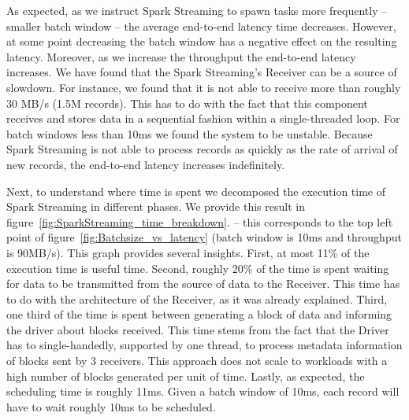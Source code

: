 As expected, as we instruct Spark Streaming to spawn tasks more frequently -- smaller batch window -- the average end-to-end latency time decreases.
However, at some point decreasing the batch window has a negative effect on the resulting latency.
Moreover, as we increase the throughput the end-to-end latency increases.
We have found that the Spark Streaming's Receiver can be a source of slowdown.
For instance, we found that it is not able to receive more than roughly 30 MB/s (1.5M records).
This has to do with the fact that this component receives and stores data in a sequential fashion within a single-threaded loop.
For batch windows less than 10ms we found the system to be unstable. 
Because Spark Streaming is not able to process records as quickly as the rate of arrival of new records, the end-to-end latency increases indefinitely.

Next, to understand where time is spent we decomposed the execution time of Spark Streaming in different phases.
We provide this result in figure~\ref{fig:SparkStreaming_time_breakdown}. 
-- this corresponds to the top left point of figure~\ref{fig:Batchsize_vs_latency} (batch window is 10ms and throughput is 90MB/s).
This graph provides several insights. 
First, at most 11\% of the execution time is useful time.
Second, roughly 20\% of the time is spent waiting for data to be transmitted from the source of data to the Receiver.
This time has to do with the architecture of the Receiver, as it was already explained.
Third, one third of the time is spent between generating a block of data and informing the driver about blocks received.
This time stems from the fact that the Driver has to single-handedly, supported by one thread, to process metadata information of blocks sent by 3 receivers.
This approach does not scale to workloads with a high number of blocks generated per unit of time.
Lastly, as expected, the scheduling time is roughly 11ms. Given a batch window of 10ms, each record will have to wait roughly 10ms to be scheduled.
